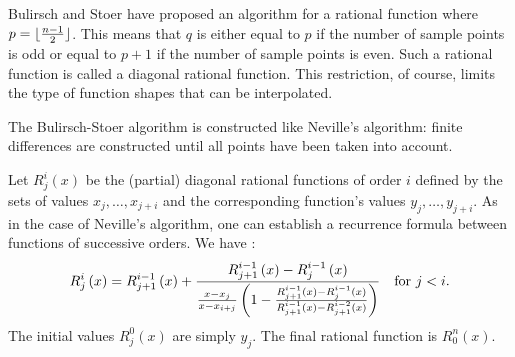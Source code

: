 \documentclass[twoside]{book}
\begin{document}
Bulirsch and Stoer have proposed an algorithm for a rational
function where $p=\lfloor{n-1 \over 2}\rfloor$. This means that
$q$ is either equal to $p$ if the number of sample points is odd
or equal to $p+1$ if the number of sample points is even. Such a
rational function is called a diagonal rational function. This
restriction, of course, limits the type of function shapes that
can be interpolated.

The Bulirsch-Stoer algorithm is constructed like Neville's
algorithm: finite differences are constructed until all points
have been taken into account.

Let $R_j^i\left(x\right)$ be the (partial) diagonal rational
functions of order $i$ defined by the sets of values
$x_j,\ldots,x_{j+i}$ and the corresponding function's values
$y_j,\ldots,y_{j+i}$. As in the case of Neville's algorithm, one
can establish a recurrence formula between functions of successive
orders. We have \cite{Press}:
\begin{equation}
\label{eq:bustoer}
R_j^i\left(x\right)=R_{j+1}^{i-1}\left(x\right)+
{R_{j+1}^{i-1}\left(x\right) - R_j^{i-1}\left(x\right) \over
{x-x_j\over x-x_{i+j}}\left(1-{R_{j+1}^{i-1}\left(x\right)
-R_j^{i-1}\left(x\right)\over R_{j+1}^{i-1}\left(x\right)
-R_{j+1}^{i-2}\left(x\right)}\right)}\mbox{\quad for $j<i$}.
\end{equation}
The initial values $R_j^0\left(x\right)$ are simply $y_j$. The
final rational function is $R_0^n\left(x\right)$.
\end{document}
